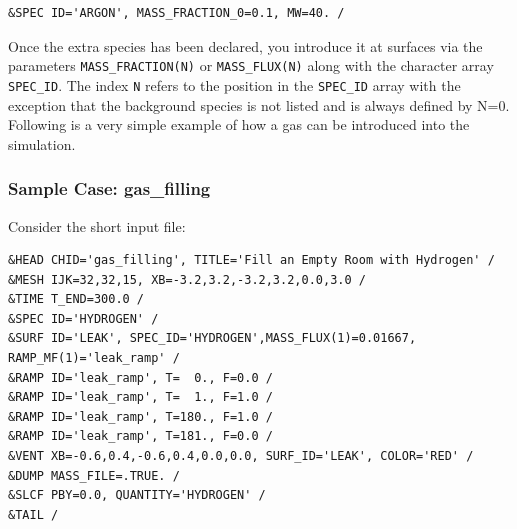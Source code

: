 \documentclass[11pt]{book}
\newcommand{\ct}{\tt\small}
\begin{document}
\footnotesize
\begin{verbatim}
&SPEC ID='ARGON', MASS_FRACTION_0=0.1, MW=40. /
\end{verbatim}
\normalsize

\noindent
Once the extra species has been declared, you introduce it at surfaces via the
parameters {\ct MASS\_FRACTION(N)} or {\ct MASS\_FLUX(N)} along with the character array {\ct SPEC\_ID}.
The index {\ct N} refers to the position in the {\ct SPEC\_ID} array with the exception that the background species is not listed and is always defined by N=0.
Following is a very simple example of how a gas can be introduced into the simulation.


\subsubsection{Sample Case: gas\_filling}

Consider the short input file:

\footnotesize
\begin{verbatim}
&HEAD CHID='gas_filling', TITLE='Fill an Empty Room with Hydrogen' /
&MESH IJK=32,32,15, XB=-3.2,3.2,-3.2,3.2,0.0,3.0 /
&TIME T_END=300.0 /
&SPEC ID='HYDROGEN' /
&SURF ID='LEAK', SPEC_ID='HYDROGEN',MASS_FLUX(1)=0.01667, RAMP_MF(1)='leak_ramp' /
&RAMP ID='leak_ramp', T=  0., F=0.0 /
&RAMP ID='leak_ramp', T=  1., F=1.0 /
&RAMP ID='leak_ramp', T=180., F=1.0 /
&RAMP ID='leak_ramp', T=181., F=0.0 /
&VENT XB=-0.6,0.4,-0.6,0.4,0.0,0.0, SURF_ID='LEAK', COLOR='RED' /
&DUMP MASS_FILE=.TRUE. /
&SLCF PBY=0.0, QUANTITY='HYDROGEN' /
&TAIL /
\end{verbatim}
\normalsize
\end{document}
